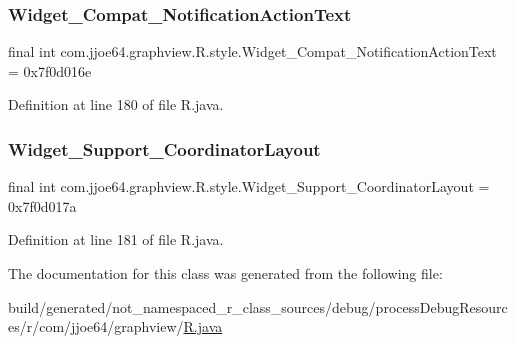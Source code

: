 \subsubsection{\texorpdfstring{Widget\_Compat\_NotificationActionText}{Widget\_Compat\_NotificationActionText}}
{\footnotesize\ttfamily final int com.\+jjoe64.\+graphview.\+R.\+style.\+Widget\+\_\+\+Compat\+\_\+\+Notification\+Action\+Text = 0x7f0d016e\hspace{0.3cm}{\ttfamily [static]}}



Definition at line 180 of file R.\+java.

\mbox{\label{classcom_1_1jjoe64_1_1graphview_1_1_r_1_1style_a8c4b92b0ea04897daa668bb79df7aa55}} 
\subsubsection{\texorpdfstring{Widget\_Support\_CoordinatorLayout}{Widget\_Support\_CoordinatorLayout}}
{\footnotesize\ttfamily final int com.\+jjoe64.\+graphview.\+R.\+style.\+Widget\+\_\+\+Support\+\_\+\+Coordinator\+Layout = 0x7f0d017a\hspace{0.3cm}{\ttfamily [static]}}



Definition at line 181 of file R.\+java.



The documentation for this class was generated from the following file\+:\begin{DoxyCompactItemize}
\item 
build/generated/not\+\_\+namespaced\+\_\+r\+\_\+class\+\_\+sources/debug/process\+Debug\+Resources/r/com/jjoe64/graphview/\mbox{\hyperlink{com_2jjoe64_2graphview_2_r_8java}{R.\+java}}\end{DoxyCompactItemize}
